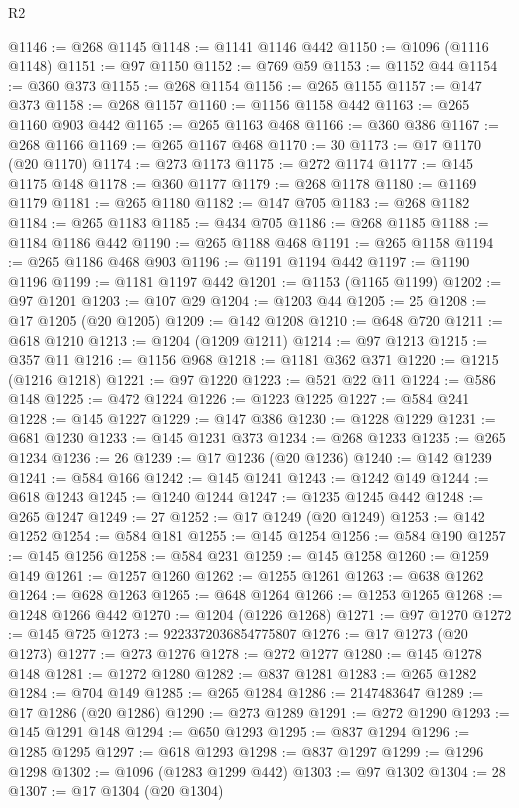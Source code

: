 \begin{lexlean}{R2}
\begin{coremodule}
@1146 := @268 @1145
@1148 := @1141 @1146 @442
@1150 := @1096 (@1116 @1148)
@1151 := @97 @1150
@1152 := @769 @59
@1153 := @1152 @44
@1154 := @360 @373
@1155 := @268 @1154
@1156 := @265 @1155
@1157 := @147 @373
@1158 := @268 @1157
@1160 := @1156 @1158 @442
@1163 := @265 @1160 @903 @442
@1165 := @265 @1163 @468
@1166 := @360 @386
@1167 := @268 @1166
@1169 := @265 @1167 @468
@1170 := 30
@1173 := @17 @1170 (@20 @1170)
@1174 := @273 @1173
@1175 := @272 @1174
@1177 := @145 @1175 @148
@1178 := @360 @1177
@1179 := @268 @1178
@1180 := @1169 @1179
@1181 := @265 @1180
@1182 := @147 @705
@1183 := @268 @1182
@1184 := @265 @1183
@1185 := @434 @705
@1186 := @268 @1185
@1188 := @1184 @1186 @442
@1190 := @265 @1188 @468
@1191 := @265 @1158
@1194 := @265 @1186 @468 @903
@1196 := @1191 @1194 @442
@1197 := @1190 @1196
@1199 := @1181 @1197 @442
@1201 := @1153 (@1165 @1199)
@1202 := @97 @1201
@1203 := @107 @29
@1204 := @1203 @44
@1205 := 25
@1208 := @17 @1205 (@20 @1205)
@1209 := @142 @1208
@1210 := @648 @720
@1211 := @618 @1210
@1213 := @1204 (@1209 @1211)
@1214 := @97 @1213
@1215 := @357 @11
@1216 := @1156 @968
@1218 := @1181 @362 @371
@1220 := @1215 (@1216 @1218)
@1221 := @97 @1220
@1223 := @521 @22 @11
@1224 := @586 @148
@1225 := @472 @1224
@1226 := @1223 @1225
@1227 := @584 @241
@1228 := @145 @1227
@1229 := @147 @386
@1230 := @1228 @1229
@1231 := @681 @1230
@1233 := @145 @1231 @373
@1234 := @268 @1233
@1235 := @265 @1234
@1236 := 26
@1239 := @17 @1236 (@20 @1236)
@1240 := @142 @1239
@1241 := @584 @166
@1242 := @145 @1241
@1243 := @1242 @149
@1244 := @618 @1243
@1245 := @1240 @1244
@1247 := @1235 @1245 @442
@1248 := @265 @1247
@1249 := 27
@1252 := @17 @1249 (@20 @1249)
@1253 := @142 @1252
@1254 := @584 @181
@1255 := @145 @1254
@1256 := @584 @190
@1257 := @145 @1256
@1258 := @584 @231
@1259 := @145 @1258
@1260 := @1259 @149
@1261 := @1257 @1260
@1262 := @1255 @1261
@1263 := @638 @1262
@1264 := @628 @1263
@1265 := @648 @1264
@1266 := @1253 @1265
@1268 := @1248 @1266 @442
@1270 := @1204 (@1226 @1268)
@1271 := @97 @1270
@1272 := @145 @725
@1273 := 9223372036854775807
@1276 := @17 @1273 (@20 @1273)
@1277 := @273 @1276
@1278 := @272 @1277
@1280 := @145 @1278 @148
@1281 := @1272 @1280
@1282 := @837 @1281
@1283 := @265 @1282
@1284 := @704 @149
@1285 := @265 @1284
@1286 := 2147483647
@1289 := @17 @1286 (@20 @1286)
@1290 := @273 @1289
@1291 := @272 @1290
@1293 := @145 @1291 @148
@1294 := @650 @1293
@1295 := @837 @1294
@1296 := @1285 @1295
@1297 := @618 @1293
@1298 := @837 @1297
@1299 := @1296 @1298
@1302 := @1096 (@1283 @1299 @442)
@1303 := @97 @1302
@1304 := 28
@1307 := @17 @1304 (@20 @1304)

\end{coremodule}
\end{lexlean}
